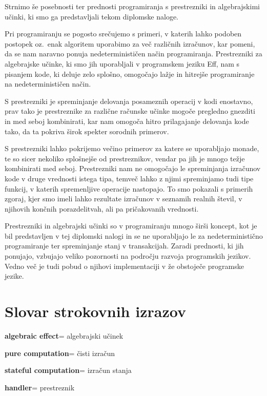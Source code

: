 \documentclass[a4paper,12pt]{article}
\theoremstyle{definition} %
\newcommand{\geslo}[2]{\noindent\textbf{#1}\hspace*{3mm}\hangindent=\parindent\hangafter=1 #2}
\begin{document}
Strnimo še posebnosti ter prednosti programiranja s prestrezniki in algebrajskimi učinki, ki smo ga predstavljali tekom diplomske naloge.

Pri programiranju se pogosto srečujemo s primeri, v katerih lahko podoben postopek oz.\ enak algoritem uporabimo za več različnih izračunov, kar pomeni, da se nam naravno  ponuja nedeterminističen način programiranja. Prestrezniki za algebrajske učinke, ki smo jih uporabljali v programskem jeziku Eff, nam s pisanjem kode, ki deluje zelo splošno, omogočajo lažje in hitrejše programiranje na nedeterminističen način. 

S prestrezniki je spreminjanje delovanja posameznih operacij v kodi enostavno, prav tako je prestreznike za različne računske učinke mogoče pregledno gnezditi in med seboj kombinirati, kar nam omogoča hitro prilagajanje delovanja kode tako, da ta pokriva širok spekter sorodnih primerov. 

S prestrezniki lahko pokrijemo večino primerov za katere se uporabljajo monade, te so sicer nekoliko splošnejše od prestreznikov, vendar pa jih je mnogo težje kombinirati med seboj. Prestrezniki nam ne omogočajo le spreminjanja izračunov kode v druge vrednosti istega tipa, temveč lahko z njimi spreminjamo tudi tipe funkcij, v katerih spremenljive operacije nastopajo. To smo pokazali s primerih zgoraj, kjer smo imeli lahko rezultate izračunov v seznamih realnih števil, v njihovih končnih porazdelitvah, ali pa pričakovanih vrednosti.

Prestrezniki in algebrajski učinki so v programiranju mnogo širši koncept, kot je bil predstavljen v tej diplomski nalogi in se ne uporabljajo le za nedeterministično programiranje ter spreminjanje stanj v transakcijah. Zaradi prednosti, ki jih ponujajo, vzbujajo veliko pozornosti na področju razvoja programskih jezikov. Vedno več je tudi pobud o njihovi implementaciji v že obstoječe programske jezike.


\section*{Slovar strokovnih izrazov}

\geslo{algebraic effect}{algebrajski učinek}

\geslo{pure computation}{čisti izračun}

\geslo{stateful computation}{izračun stanja}

\geslo{handler}{prestreznik}

%
%
\end{document}
